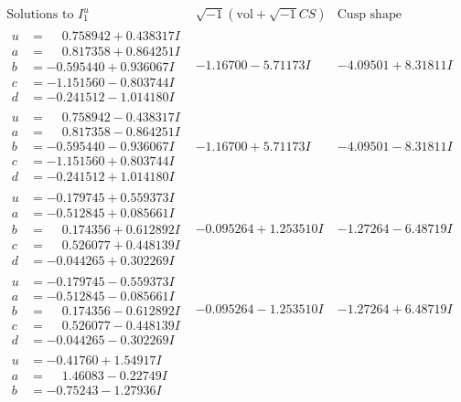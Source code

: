 \documentclass[1p]{elsarticle_modified}
\theoremstyle{definition}
\newcommand{\I}{\sqrt{-1}}
\begin{document}
$$\begin{array}{c|c|c}  
\text{Solutions to }I^u_{1}& \I (\text{vol} + \sqrt{-1}CS) & \text{Cusp shape}\\
 \hline 
\begin{aligned}
u &= \phantom{-}0.758942 + 0.438317 I \\
a &= \phantom{-}0.817358 + 0.864251 I \\
b &= -0.595440 + 0.936067 I \\
c &= -1.151560 - 0.803744 I \\
d &= -0.241512 - 1.014180 I\end{aligned}
 & -1.16700 - 5.71173 I & -4.09501 + 8.31811 I \\ \hline\begin{aligned}
u &= \phantom{-}0.758942 - 0.438317 I \\
a &= \phantom{-}0.817358 - 0.864251 I \\
b &= -0.595440 - 0.936067 I \\
c &= -1.151560 + 0.803744 I \\
d &= -0.241512 + 1.014180 I\end{aligned}
 & -1.16700 + 5.71173 I & -4.09501 - 8.31811 I \\ \hline\begin{aligned}
u &= -0.179745 + 0.559373 I \\
a &= -0.512845 + 0.085661 I \\
b &= \phantom{-}0.174356 + 0.612892 I \\
c &= \phantom{-}0.526077 + 0.448139 I \\
d &= -0.044265 + 0.302269 I\end{aligned}
 & -0.095264 + 1.253510 I & -1.27264 - 6.48719 I \\ \hline\begin{aligned}
u &= -0.179745 - 0.559373 I \\
a &= -0.512845 - 0.085661 I \\
b &= \phantom{-}0.174356 - 0.612892 I \\
c &= \phantom{-}0.526077 - 0.448139 I \\
d &= -0.044265 - 0.302269 I\end{aligned}
 & -0.095264 - 1.253510 I & -1.27264 + 6.48719 I \\ \hline\begin{aligned}
u &= -0.41760 + 1.54917 I \\
a &= \phantom{-}1.46083 - 0.22749 I \\
b &= -0.75243 - 1.27936 I \\

\end{aligned}
\end{array}$$
\end{document}
